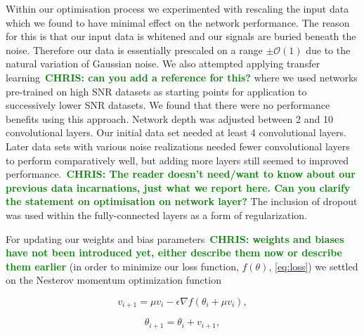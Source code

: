 \documentclass[%
 amsmath,amssymb,
 aps,
 twocolumn,
 prl,
 reprint,
floatfix,
]{revtex4-1}
\newcommand{\chris}[1]{\textbf{\textcolor{green}{CHRIS: #1}}}
\begin{document}
%
%
Within our optimisation process we experimented with rescaling the input data
which we found to have minimal effect on the network performance. The reason
for this is that our input data is whitened and our signals are buried beneath
the noise. Therefore our data is essentially prescaled on a range
$\pm\mathcal{O}(1)$ due to the natural variation of Gaussian noise. We also
attempted applying transfer learning~\chris{can you add a reference for this?}
where we used networks pre-trained on high \ac{SNR} datasets as starting points
for application to successively lower \ac{SNR} datasets. We found that there
were no performance benefits using this approach.  Network depth was adjusted
between 2 and 10 convolutional layers.  Our initial data set needed at least 4
convolutional layers. Later data sets with various noise realizations needed
fewer convolutional layers to perform comparatively well, but adding more
layers still seemed to improved performance.~\chris{The reader doesn't
need/want to know about our previous data incarnations, just what we report
here. Can you clarify the statement on optimisation on network layer?} The
inclusion of dropout was used within the fully-connected layers as a form of
regularization.

%
%
For updating our weights and bias parameters~\chris{weights and biases have not
been introduced yet, either describe them now or describe them earlier} (in
order to minimize our loss function, $f(\theta)$, \eqref{eq:loss}) we settled
on the Nesterov momentum optimization function

\begin{equation} \label{eq:nesterov1}
v_{i+1} = \mu v_{i} - \epsilon \nabla f(\theta_{i} + \mu v_{i}),
\end{equation}

\begin{equation} \label{eq:nesterov2}
\theta_{i+1} = \theta_{i} + v_{i+1},
\end{equation} \\
\end{document}

